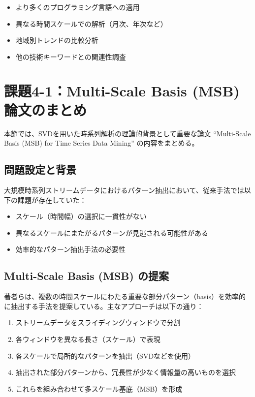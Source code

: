 \documentclass[a4paper,11pt]{jsarticle}
\begin{document}
\begin{itemize}
  \item より多くのプログラミング言語への適用
  \item 異なる時間スケールでの解析（月次、年次など）
  \item 地域別トレンドの比較分析
  \item 他の技術キーワードとの関連性調査
\end{itemize}

\section{課題4-1：Multi-Scale Basis (MSB) 論文のまとめ}

本節では、SVDを用いた時系列解析の理論的背景として重要な論文 ``Multi-Scale Basis (MSB) for Time Series Data Mining'' の内容をまとめる。

\subsection{問題設定と背景}

大規模時系列ストリームデータにおけるパターン抽出において、従来手法では以下の課題が存在していた：

\begin{itemize}
  \item スケール（時間幅）の選択に一貫性がない
  \item 異なるスケールにまたがるパターンが見逃される可能性がある
  \item 効率的なパターン抽出手法の必要性
\end{itemize}

\subsection{Multi-Scale Basis (MSB) の提案}

著者らは、複数の時間スケールにわたる重要な部分パターン（basis）を効率的に抽出する手法を提案している。主なアプローチは以下の通り：

\begin{enumerate}
  \item ストリームデータをスライディングウィンドウで分割
  \item 各ウィンドウを異なる長さ（スケール）で表現
  \item 各スケールで局所的なパターンを抽出（SVDなどを使用）
  \item 抽出された部分パターンから、冗長性が少なく情報量の高いものを選択
  \item これらを組み合わせて多スケール基底（MSB）を形成
\end{enumerate}
\end{document}

